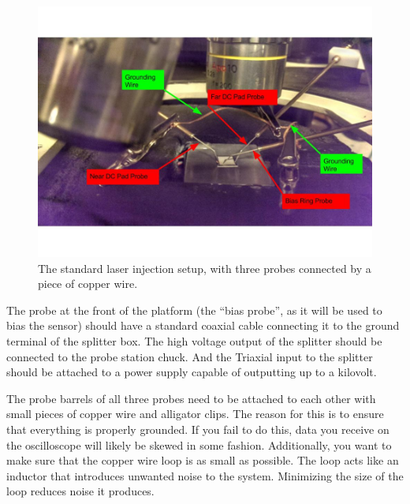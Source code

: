 \documentclass{report}
\begin{document}
            \begin{figure}[h] 
                \includegraphics[height=.4\textheight]{probe_tips_00}
                \centering
                \caption{ The standard laser injection setup, with three probes connected by a piece of copper wire. }
                \label{fig:probe_tips_00}
            \end{figure}

            The probe at the front of the platform (the ``bias probe'', as it will be used to bias the sensor) should have a standard coaxial cable connecting it to the ground terminal of the splitter box. The high voltage output of the splitter should be connected to the probe station chuck. And the Triaxial input to the splitter should be attached to a power supply capable of outputting up to a kilovolt. 
            
            The probe barrels of all three probes need to be attached to each other with small pieces of copper wire and alligator clips. The reason for this is to ensure that everything is properly grounded. If you fail to do this, data you receive on the oscilloscope will likely be skewed in some fashion. Additionally, you want to make sure that the copper wire loop is as small as possible. The loop acts like an inductor that introduces unwanted noise to the system. Minimizing the size of the loop reduces noise it produces.
\end{document}
